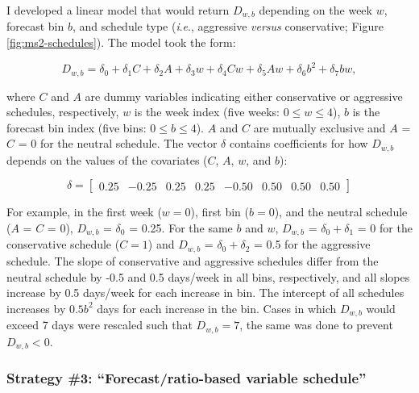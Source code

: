 \documentclass[12pt,]{book}
\theoremstyle{definition}
\theoremstyle{definition}
\theoremstyle{definition}
\theoremstyle{remark}
\begin{document}
\noindent
I developed a linear model that would return \(D_{w,b}\) depending on
the week \(w\), forecast bin \(b\), and schedule type
(\emph{i}.\emph{e}., aggressive \emph{versus} conservative; Figure
\ref{fig:ms2-schedules}). The model took the form:

\begin{equation}
  D_{w,b} = \delta_0 + \delta_1C + \delta_2A + \delta_3 w + \delta_4 Cw + \delta_5 Aw + \delta_6 b^2 + \delta_7 bw,
  \label{eq:gen-ms2-schedule}
\end{equation}

\noindent
where \(C\) and \(A\) are dummy variables indicating either conservative
or aggressive schedules, respectively, \(w\) is the week index (five
weeks: \(0 \le w \le 4\)), \(b\) is the forecast bin index (five bins:
\(0 \le b \le 4\)). \(A\) and \(C\) are mutually exclusive and \(A\) =
\(C\) = 0 for the neutral schedule. The vector \(\delta\) contains
coefficients for how \(D_{w,b}\) depends on the values of the covariates
(\(C\), \(A\), \(w\), and \(b\)):

\[
\delta=
  \begin{bmatrix}
    0.25&
    -0.25&
    0.25&
    0.25&
    -0.50&
    0.50&
    0.50&
    0.50
  \end{bmatrix}
\]

\noindent
For example, in the first week (\(w = 0\)), first bin (\(b = 0\)), and
the neutral schedule (\(A\) = \(C\) = 0), \(D_{w,b}\) = \(\delta_0\) =
0.25. For the same \(b\) and \(w\), \(D_{w,b}\) =
\(\delta_0 + \delta_1\) = 0 for the conservative schedule (\(C = 1\))
and \(D_{w,b}\) = \(\delta_0 + \delta_2\) = 0.5 for the aggressive
schedule. The slope of conservative and aggressive schedules differ from
the neutral schedule by -0.5 and 0.5 days/week in all bins,
respectively, and all slopes increase by 0.5 days/week for each increase
in bin. The intercept of all schedules increases by \(0.5b^2\) days for
each increase in the bin. Cases in which \(D_{w,b}\) would exceed 7 days
were rescaled such that \(D_{w,b} = 7\), the same was done to prevent
\(D_{w,b} < 0\).

\subsubsection{\texorpdfstring{Strategy \#3: ``Forecast/ratio-based
variable
schedule''}{Strategy \#3: Forecast/ratio-based variable schedule}}\label{strategy-3-forecastratio-based-variable-schedule}
\end{document}

